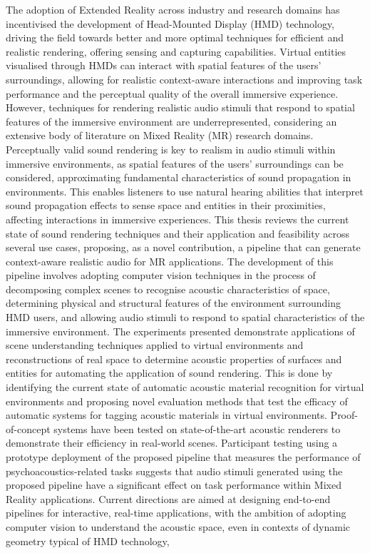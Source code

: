 \sloppy
{\small
    The adoption of Extended Reality across industry and research domains has incentivised the development of Head-Mounted Display (HMD) technology, driving the field towards better and more optimal techniques for efficient and realistic rendering, offering sensing and capturing capabilities. Virtual entities visualised through HMDs can interact with spatial features of the users' surroundings, allowing for realistic context-aware interactions and improving task performance and the perceptual quality of the overall immersive experience. However, techniques for rendering realistic audio stimuli that respond to spatial features of the immersive environment are underrepresented, considering an extensive body of literature on Mixed Reality (MR) research domains. Perceptually valid sound rendering is key to realism in audio stimuli within immersive environments, as spatial features of the users' surroundings can be considered, approximating fundamental characteristics of sound propagation in environments. This enables listeners to use natural hearing abilities that interpret sound propagation effects to sense space and entities in their proximities, affecting interactions in immersive experiences. This thesis reviews the current state of sound rendering techniques and their application and feasibility across several use cases,  proposing, as a novel contribution, a pipeline that can generate context-aware realistic audio for MR applications. The development of this pipeline involves adopting computer vision techniques in the process of decomposing complex scenes to recognise acoustic characteristics of space, determining physical and structural features of the environment surrounding HMD users, and allowing audio stimuli to respond to spatial characteristics of the immersive environment. The experiments presented demonstrate applications of scene understanding techniques applied to virtual environments and reconstructions of real space to determine acoustic properties of surfaces and entities for automating the application of sound rendering. This is done by identifying the current state of automatic acoustic material recognition for virtual environments and proposing novel evaluation methods that test the efficacy of automatic systems for tagging acoustic materials in virtual environments. Proof-of-concept systems have been tested on state-of-the-art acoustic renderers to demonstrate their efficiency in real-world scenes. Participant testing using a prototype deployment of the proposed pipeline that measures the performance of psychoacoustics-related tasks suggests that audio stimuli generated using the proposed pipeline have a significant effect on task performance within Mixed Reality applications. Current directions are aimed at designing end-to-end pipelines for interactive, real-time applications, with the ambition of adopting computer vision to understand the acoustic space, even in contexts of dynamic geometry typical of HMD technology, }
